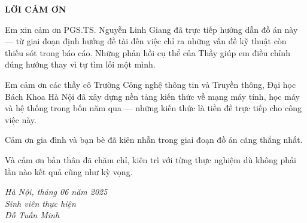\documentclass[../DoAn.tex]{subfiles}
\begin{document}
\begin{center}
    \Large{\textbf{LỜI CẢM ƠN}}\\
\end{center}
\vspace{1cm}

Em xin cảm ơn PGS.TS. Nguyễn Linh Giang đã trực tiếp hướng dẫn đồ án này --- từ giai đoạn định hướng đề tài đến việc chỉ ra những vấn đề kỹ thuật còn thiếu sót trong báo cáo. Những phản hồi cụ thể của Thầy giúp em điều chỉnh đúng hướng thay vì tự tìm lối một mình.

Em cảm ơn các thầy cô Trường Công nghệ thông tin và Truyền thông, Đại học Bách Khoa Hà Nội đã xây dựng nền tảng kiến thức về mạng máy tính, học máy và hệ thống trong bốn năm qua --- những kiến thức là tiền đề trực tiếp cho công việc này.

Cảm ơn gia đình và bạn bè đã kiên nhẫn trong giai đoạn đồ án căng thẳng nhất.

Và cảm ơn bản thân đã chăm chỉ, kiên trì với từng thực nghiệm dù không phải lần nào kết quả cũng như kỳ vọng.

\vspace{1.5cm}
\begin{flushright}
\textit{Hà Nội, tháng 06 năm 2025}\\[0.5cm]
\textit{Sinh viên thực hiện}\\[1.5cm]
\textit{Đỗ Tuấn Minh}
\end{flushright}
\end{document}
